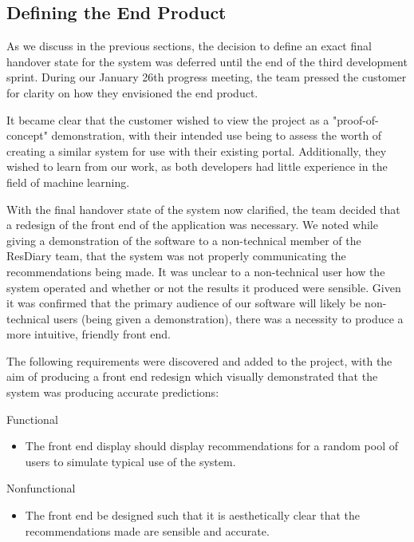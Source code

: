 \documentclass{l3proj}
\begin{document}
\subsection{Defining the End Product}
\label{sec:jandefinedstate}

As we discuss in the previous sections, the decision to define an exact final handover state for the system was deferred until the end of the third development sprint. During our January 26th progress meeting, the team pressed the customer for clarity on how they envisioned the end product. 

It became clear that the customer wished to view the project as a "proof-of-concept" demonstration, with their intended use being to assess the worth of creating a similar system for use with their existing portal. Additionally, they wished to learn from our work, as both developers had little experience in the field of machine learning.

With the final handover state of the system now clarified, the team decided that a redesign of the front end of the application was necessary. We noted while giving a demonstration of the software to a non-technical member of the ResDiary team, that the system was not properly communicating the recommendations being made. It was unclear to a non-technical user how the system operated and whether or not the results it produced were sensible. Given it was confirmed that the primary audience of our software will likely be non-technical users (being given a demonstration), there was a necessity to produce a more intuitive, friendly front end. 

The following requirements were discovered and added to the project, with the aim of producing a front end redesign which visually demonstrated that the system was producing accurate predictions:

Functional
\begin{itemize}
\item The front end display should display recommendations for a random pool of users to simulate typical use of the system.
\end{itemize}

Nonfunctional
\begin{itemize}
\item The front end be designed such that it is aesthetically clear that the recommendations made are sensible and accurate.
\end{itemize}
\end{document}
